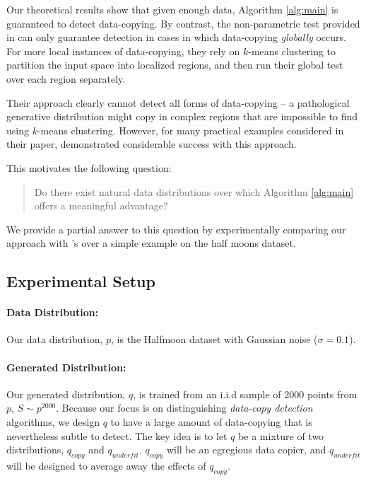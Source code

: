 Our theoretical results show that given enough data, Algorithm \ref{alg:main} is guaranteed to detect data-copying. By contrast, the non-parametric test provided in \cite{MCD2020} can only guarantee detection in cases in which data-copying \textit{globally} occurs. For more local instances of data-copying, they rely on $k$-means clustering to partition the input space into localized regions, and then run their global test over each region separately.

Their approach clearly cannot detect all forms of data-copying -- a pathological generative distribution might copy in complex regions that are impossible to find using $k$-means clustering. However, for many practical examples considered in their paper, \cite{MCD2020} demonstrated considerable success with this approach. 

This motivates the following question: 
\begin{quote}
Do there exist natural data distributions over which Algorithm \ref{alg:main} offers a meaningful advantage?
\end{quote} 

We provide a partial answer to this question by experimentally comparing our approach with \cite{MCD2020}'s over a simple example on the half moons dataset.

\subsection{Experimental Setup}

\paragraph{Data Distribution:} Our data distribution, $p$, is the Halfmoon dataset with Gaussian noise ($\sigma = 0.1$).  

\paragraph{Generated Distribution:} Our generated distribution, $q$, is trained from an i.i.d sample of 2000 points from $p$, $S \sim p^{2000}$. Because our focus is on distinguishing \textit{data-copy detection} algorithms, we design $q$ to have a large amount of data-copying that is nevertheless subtle to detect. The key idea is to let $q$ be a mixture of two distributions, $q_{copy}$ and $q_{underfit}$. $q_{copy}$ will be an egregious data copier, and $q_{underfit}$ will be designed to average away the effects of $q_{copy}$. 

